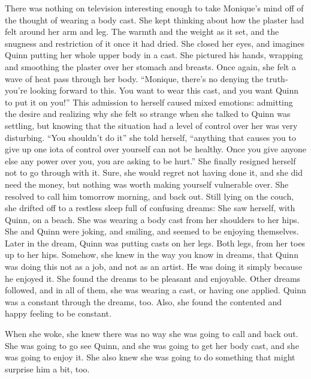 \begin{thought}
There was nothing on television interesting enough to take Monique's mind off of the thought
of wearing a body cast. She kept thinking about how the plaster had felt around her arm and leg.
The warmth and the weight as it set, and the snugness and restriction of it once it had dried.
She closed her eyes, and imagines Quinn putting her whole upper body in a cast. She pictured his
hands, wrapping and smoothing the plaster over her stomach and breasts. Once again, she felt a
wave of heat pass through her body. ``Monique, there's no denying the truth- you're looking
forward to this. You want to wear this cast, and you want Quinn to put it on you!'' This
admission to herself caused mixed emotions: admitting the desire and realizing why she felt so
strange when she talked to Quinn was settling, but knowing that the situation had a level of
control over her was very disturbing. ``You shouldn't do it'' she told herself, ``anything that
causes you to give up one iota of control over yourself can not be healthy. Once you give anyone
else any power over you, you are asking to be hurt.'' She finally resigned herself not to go
through with it. Sure, she would regret not having done it, and she did need the money, but
nothing was worth making yourself vulnerable over. She resolved to call him tomorrow morning,
and back out. Still lying on the couch, she drifted off to a restless sleep full of confusing
dreams: She saw herself, with Quinn, on a beach. She was wearing a body cast from her shoulders
to her hips. She and Quinn were joking, and smiling, and seemed to be enjoying themselves. Later
in the dream, Quinn was putting casts on her legs. Both legs, from her toes up to her hips.
Somehow, she knew in the way you know in dreams, that Quinn was doing this not as a job, and not
as an artist. He was doing it simply because he enjoyed it. She found the dreams to be pleasant
and enjoyable. Other dreams followed, and in all of them, she was wearing a cast, or having one
applied. Quinn was a constant through the dreams, too. Also, she found the contented and happy
feeling to be constant.

When she woke, she knew there was no way she was going to call and back out. She was going
to go see Quinn, and she was going to get her body cast, and she was going to enjoy it. She also
knew she was going to do something that might surprise him a bit, too.
\end{thought}
